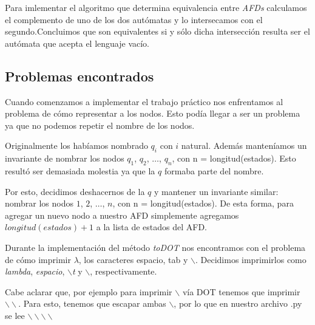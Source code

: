 Para imlementar el algoritmo que determina equivalencia entre \emph{AFDs} calculamos el complemento de uno de los dos autómatas y lo intersecamos con el segundo.Concluimos que son equivalentes si y sólo dicha intersección resulta ser el autómata que acepta el lenguaje vacío.


\subsection{Problemas encontrados}

Cuando comenzamos a implementar el trabajo práctico nos enfrentamos al problema de cómo representar a los nodos. Esto podía llegar a ser un problema ya que no podemos repetir el nombre de los nodos.

Originalmente los habíamos nombrado \emph{$q_i$} con $i$ natural. Además manteníamos un invariante de nombrar los nodos $q_1$, $q_2$, $\hdots$, $q_n$, con n = longitud(estados). Esto resultó ser demasiada molestia ya que la $q$ formaba parte del nombre.

Por esto, decidimos deshacernos de la $q$ y mantener un invariante similar: nombrar los nodos $1$, $2$, $\hdots$, $n$, con n = longitud(estados). De esta forma, para agregar un nuevo nodo a nuestro AFD simplemente agregamos $longitud(estados) + 1$ a la lista de estados del AFD.


Durante la implementación del método \emph{toDOT} nos encontramos con el problema de cómo imprimir $\lambda$, los caracteres espacio, tab y $\backslash$. Decidimos imprimirlos como \emph{lambda}, \emph{espacio},  \emph{$\backslash$t} y $\backslash$, respectivamente.

Cabe aclarar que, por ejemplo para imprimir $\backslash$ vía DOT tenemos que imprimir $\backslash\backslash$. Para esto, tenemos que escapar ambas $\backslash$, por lo que en nuestro archivo .py se lee $\backslash\backslash\backslash\backslash$



